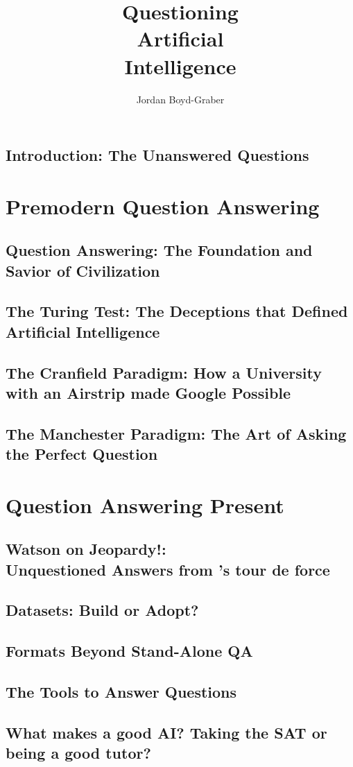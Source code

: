 \documentclass{style/cambridge7A}
\title{Questioning \\ Artificial \\ Intelligence}
\author{Jordan Boyd-Graber}
\newif\ifproposal\proposalfalse
\newcommand{\proposalpart}[2]{
  \ifproposal
  \else
  \part{#1}
  \fi
}
\newcommand{\chapterfile}[3]{
  \ifproposal
      \begingroup
      \renewcommand{\cleardoublepage}{}
      \renewcommand{\clearpage}{}
      \chapter{#3}\label{ch:#2}
      \endgroup
      \vspace{-0.5cm}
      
      \vspace{-2.5cm}
  \else
      \chapter{#3}
      \label{ch:#2}
      \begin{quote}
        
      \end{quote} 
      
  \fi
  }
\begin{document}
\setcounter{secnumdepth}{1}







\clearpage
\ifproposal

  \chapter{Chapter Synopses}

  \setcounter{chapter}{0}

  \titleformat{\chapter}[display]
  {\normalfont%
      \normalsize %
      \bfseries}{}{20pt}{%
      \normalsize \thechapter: %
      }
  
  A brief description of each of the proposed chapters.
  \else
  
\fi


\chapterfile{010}{introduction}{Introduction: The Unanswered Questions}

\proposalpart{Premodern Question Answering}{1}

\chapterfile{110}{civilization}{Question Answering: The Foundation and
  \\ Savior of Civilization}


\chapterfile{120}{turing}{The Turing Test: The Deceptions that Defined Artificial Intelligence}

\chapterfile{130}{ir}{The Cranfield Paradigm: How a University with an Airstrip made Google Possible}

\chapterfile{140}{manchester}{The Manchester Paradigm: The Art of Asking the Perfect Question}


  \proposalpart{Question Answering Present}{2}

  \chapterfile{200}{watson}{Watson on Jeopardy!: \\ Unquestioned Answers from \abr{ibm}'s tour de force}

  \chapterfile{210}{first_modern_datasets}{Datasets: Build or Adopt?}

\chapterfile{220}{encoders}{Formats Beyond Stand-Alone QA}

\chapterfile{230}{decoders}{The Tools to Answer Questions}

\chapterfile{240}{leaderboards}{What makes a good AI?  Taking the SAT or being a good tutor?}
\end{document}
